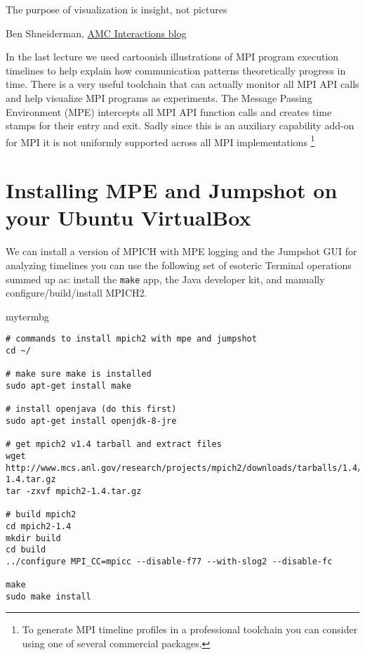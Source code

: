 
% 

\epigraph{The purpose of visualization is insight, not pictures}{
Ben Shneiderman, \href{http://interactions.acm.org/blog/view/the-purpose-of-visualization-is-insight-not-pictures-an-interview-with-ben}{AMC Interactions blog}}

\minitoc

In the last lecture we used cartoonish illustrations of MPI program execution timelines to help explain how communication patterns theoretically progress in time. There is a very useful toolchain that can actually monitor all MPI API calls and help visualize MPI programs as experiments. The Message Passing Environment (MPE) intercepts all MPI API function calls and creates time stamps for their entry and exit. Sadly since this is an auxiliary capability add-on for MPI it is not uniformly supported across all MPI implementations \footnote{To generate MPI timeline profiles in a professional toolchain you can consider using one of several commercial packages.}

\section{Installing MPE and Jumpshot on your Ubuntu VirtualBox}
We can install a version of MPICH with MPE logging and the Jumpshot GUI for analyzing timelines you can use the following set of esoteric Terminal operations summed up as: install the \texttt{make}  app, the Java developer kit, and manually configure/build/install MPICH2.

\begin{tsession}{mytermbg}
\begin{Verbatim}[frame=single]
# commands to install mpich2 with mpe and jumpshot
cd ~/

# make sure make is installed
sudo apt-get install make

# install openjava (do this first)
sudo apt-get install openjdk-8-jre

# get mpich2 v1.4 tarball and extract files
wget http://www.mcs.anl.gov/research/projects/mpich2/downloads/tarballs/1.4/mpich2-1.4.tar.gz
tar -zxvf mpich2-1.4.tar.gz

# build mpich2
cd mpich2-1.4
mkdir build
cd build
../configure MPI_CC=mpicc --disable-f77 --with-slog2 --disable-fc

make
sudo make install
\end{Verbatim}
\end{tsession}


